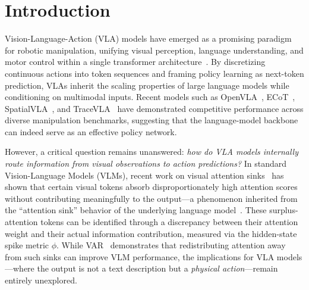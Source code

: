 \section{Introduction}
\label{sec:intro}

Vision-Language-Action (VLA) models have emerged as a promising paradigm for robotic manipulation, unifying visual perception, language understanding, and motor control within a single transformer architecture~\cite{brohan2023rt2, kim2024openvla, zheng2024tracevla, qu2025spatialvla}.
By discretizing continuous actions into token sequences and framing policy learning as next-token prediction, VLAs inherit the scaling properties of large language models while conditioning on multimodal inputs.
Recent models such as OpenVLA~\cite{kim2024openvla}, ECoT~\cite{zawalski2024ecot}, SpatialVLA~\cite{qu2025spatialvla}, and TraceVLA~\cite{zheng2024tracevla} have demonstrated competitive performance across diverse manipulation benchmarks, suggesting that the language-model backbone can indeed serve as an effective policy network.

However, a critical question remains unanswered: \textit{how do VLA models internally route information from visual observations to action predictions?}
In standard Vision-Language Models (VLMs), recent work on visual attention sinks~\cite{var2024} has shown that certain visual tokens absorb disproportionately high attention scores without contributing meaningfully to the output---a phenomenon inherited from the ``attention sink'' behavior of the underlying language model~\cite{xiao2024efficient}.
These surplus-attention tokens can be identified through a discrepancy between their attention weight and their actual information contribution, measured via the hidden-state spike metric $\phi$.
While VAR~\cite{var2024} demonstrates that redistributing attention away from such sinks can improve VLM performance, the implications for VLA models---where the output is not a text description but a \emph{physical action}---remain entirely unexplored.

